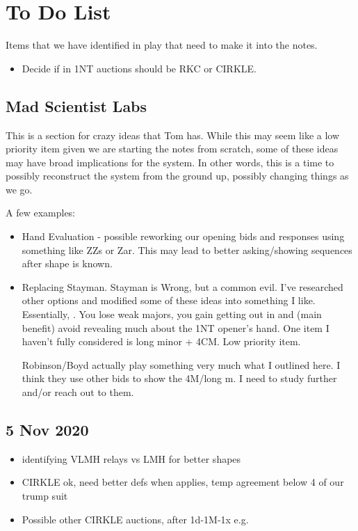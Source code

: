 \documentclass[tom-ari]{subfile}
\begin{document}
	
	\chapter{To Do List}
	
	Items that we have identified in play that need to make it into the notes.
	\begin{itemize}
		\item Decide if  in 1NT auctions should be RKC or CIRKLE. 
	\end{itemize}

	\section{Mad Scientist Labs}
	
	This is a section for crazy ideas that Tom has.  While this may seem like a low priority item given we are starting the notes from scratch, some of these ideas may have broad implications for the system.  In other words, this is a time to possibly reconstruct the system from the ground up, possibly changing things as we go.
	
	A few examples:
	
	\begin{itemize}
		\item Hand Evaluation - possible reworking our opening bids and responses using something like ZZs or Zar.  This may lead to better asking/showing sequences after shape is known.
		\item Replacing Stayman.  Stayman is Wrong, but a common evil.  I've researched other options and modified some of these ideas into something I like.  Essentially, \rightarrow{}.  You lose weak majors, you gain getting out in  and (main benefit) avoid revealing much about the 1NT opener's hand.  One item I haven't fully considered is long minor + 4CM.  Low priority item.
		
		 Robinson/Boyd actually play something very much what I outlined here.  I think they use other bids to show the 4M/long m.  I need to study further and/or reach out to them.
	\end{itemize}

	\section{5 Nov 2020}
	\begin{itemize}
		\item identifying VLMH relays vs LMH for better shapes
		\item CIRKLE ok, need better defs when applies, temp agreement below 4 of our trump suit
		\item Possible other CIRKLE auctions, after 1d-1M-1x e.g.
	\end{itemize}
\end{document}
